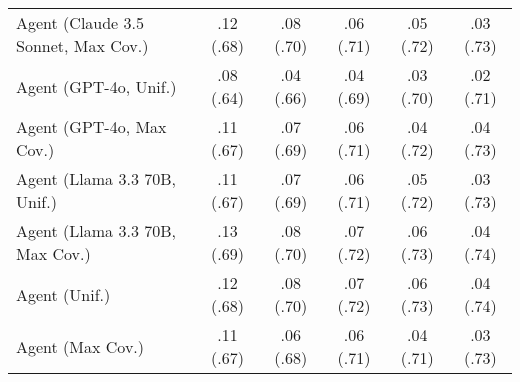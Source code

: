 \begin{table}[h!]
\begin{tabular}{lccccc}
    Agent (Claude 3.5 Sonnet, Max Cov.) & .12 {\small (.68)} & .08 {\small (.70)} & .06 {\small (.71)} & .05 {\small (.72)} & .03 {\small (.73)} \\
    Agent (GPT-4o, Unif.) & .08 {\small (.64)} & .04 {\small (.66)} & .04 {\small (.69)} & .03 {\small (.70)} & .02 {\small (.71)} \\
    Agent (GPT-4o, Max Cov.) & .11 {\small (.67)} & .07 {\small (.69)} & .06 {\small (.71)} & .04 {\small (.72)} & .04 {\small (.73)} \\
    Agent (Llama 3.3 70B, Unif.) & .11 {\small (.67)} & .07 {\small (.69)} & .06 {\small (.71)} & .05 {\small (.72)} & .03 {\small (.73)} \\
    Agent (Llama 3.3 70B, Max Cov.) & .13 {\small (.69)} & .08 {\small (.70)} & \cellcolor{bronze!30}.07 {\small (.72)} & .06 {\small (.73)} & .04 {\small (.74)} \\
    Agent (Unif.) & .12 {\small (.68)} & .08 {\small (.70)} & .07 {\small (.72)} & .06 {\small (.73)} & .04 {\small (.74)} \\
    Agent (Max Cov.) & .11 {\small (.67)} & .06 {\small (.68)} & .06 {\small (.71)} & .04 {\small (.71)} & .03 {\small (.73)} \\
    \bottomrule
    \end{tabular}
\end{table}